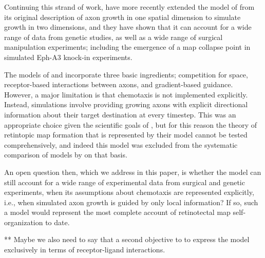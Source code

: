 \documentclass[9pt,lineno,draft]{elife}
\begin{document}
Continuing this strand of work, \cite{Simpson2011} have more recently extended the model of \cite{Overton1982} from its original description of axon growth in one spatial dimension to simulate growth in two dimensions, and they have shown that it can account for a wide range of data from genetic studies, as well as a wide range of surgical manipulation experiments; including the emergence of a map collapse point in simulated Eph-A3 knock-in experiments.

The models of \cite{Overton1982} and \cite{Simpson2011} incorporate three basic ingredients; competition for space, receptor-based interactions between axons, and gradient-based guidance. However, a major limitation is that chemotaxis is not implemented explicitly. Instead, simulations involve providing growing axons with explicit directional information about their target destination at every timestep. This was an appropriate choice given the scientific goals of \cite{Simpson2011}, but for this reason the theory of retintopic map formation that is represented by their model cannot be tested comprehensively, and indeed this model was excluded from the systematic comparison of models by \cite{Hjorth2015} on that basis.

An open question then, which we address in this paper, is whether the \cite{Simpson2011} model can still account for a wide range of experimental data from surgical and genetic experiments, when its assumptions about chemotaxis are represented explicitly, i.e., when simulated axon growth is guided by only local information? If so, such a model would represent the most complete account of retinotectal map self-organization to date.

** Maybe we also need to say that a second objective to to express the model
exclusively in terms of receptor-ligand interactions.



\end{document}

